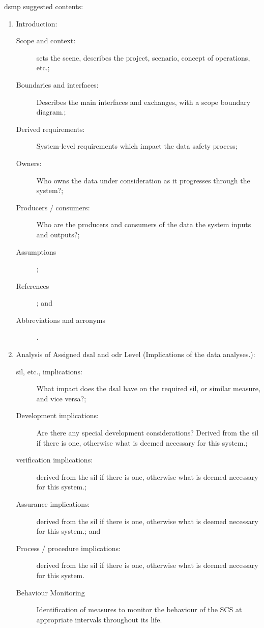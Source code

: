 \Gls{dsmp} suggested contents:
\begin{enumerate}
  \item Introduction:
  \begin{description}
    \item[Scope and context:] sets the scene, describes the project, scenario, concept of operations, etc.;
    \item[Boundaries and interfaces:] Describes the main interfaces and exchanges, with a scope boundary diagram.;
    \item[Derived requirements:] System-level requirements which impact the data safety process;
    \item[Owners:] Who owns the data under consideration as it progresses through the system?;
    \item[Producers / consumers:] Who are the producers and consumers of the data the system inputs and outputs?;
    \item[Assumptions];
    \item[References]; and
    \item[Abbreviations and acronyms].
  \end{description}
  \item Analysis of Assigned \gls{dsal} and \gls{odr} Level (Implications of the data analyses.):
  \begin{description}
    \item[\Gls{sil}, etc., implications:] What impact does the \gls{dsal} have on the required \gls{sil}, or similar measure, and vice versa?;
    \item[Development implications:] Are there any special development considerations? Derived from the \gls{sil} if there is one, otherwise what is deemed necessary for this system.;
    \item[\Gls{verification} implications:] derived from the \gls{sil} if there is one, otherwise what is deemed necessary for this system.;
    \item[Assurance implications:] derived from the \gls{sil} if there is one, otherwise what is deemed necessary for this system.; and
    \item[Process / procedure implications:] derived from the \gls{sil} if there is one, otherwise what is deemed necessary for this system.
    \item[Behaviour Monitoring]Identification of measures to monitor the behaviour of the SCS at appropriate intervals throughout its life.

\end{description}
\end{enumerate}

